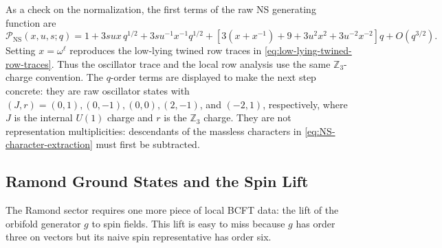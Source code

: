 \documentclass[11pt]{article}
\newcommand{\Z}{\mathbb{Z}}
\newcommand{\NS}{\mathrm{NS}}
\begin{document}
As a check on the normalization, the first terms of the raw NS generating function are
\begin{equation}
  \mathcal P_{\NS}(x,u,s;q)
  =
  1
  +
  3sux\,q^{1/2}
  +
  3su^{-1}x^{-1}q^{1/2}
  +
  \left[
    3(x+x^{-1})
    +
    9
    +
    3u^2x^2
    +
    3u^{-2}x^{-2}
  \right]q
  +
  O(q^{3/2}).
  \label{eq:parent-NS-first-terms}
\end{equation}
Setting \(x=\omega^\ell\) reproduces the low-lying twined row traces in
\eqref{eq:low-lying-twined-row-traces}. Thus the oscillator trace and the local row analysis
use the same \(\Z_3\)-charge convention. The \(q\)-order terms are displayed to make the next
step concrete: they are raw oscillator states with \((J,r)=(0,1),(0,-1),(0,0),(2,-1)\), and
\((-2,1)\), respectively, where \(J\) is the internal \(U(1)\) charge and \(r\) is the
\(\Z_3\) charge. They are not representation multiplicities: descendants of the massless
characters in \eqref{eq:NS-character-extraction} must first be subtracted.

\subsection{Ramond Ground States and the Spin Lift}

The Ramond sector requires one more piece of local BCFT data: the lift of the orbifold
generator \(g\) to spin fields. This lift is easy to miss because \(g\) has order three on
vectors but its naive spin representative has order six.
\end{document}
